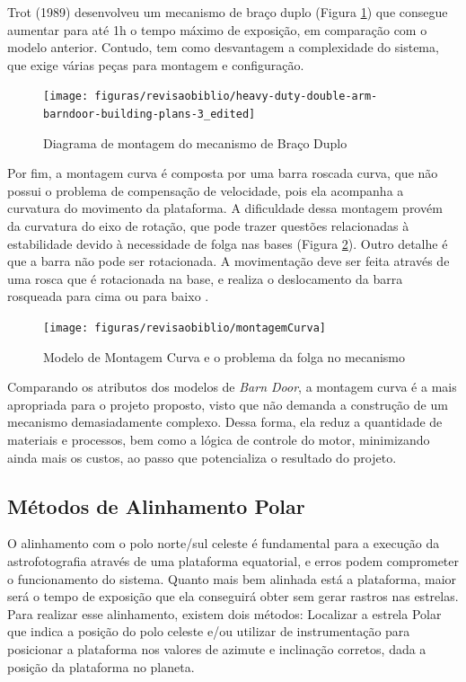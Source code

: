 Trot (1989) desenvolveu um mecanismo de braço duplo (Figura \ref{fig:doublearm}) que consegue aumentar para até 1h o tempo máximo de exposição, em comparação com o modelo anterior. Contudo, tem como desvantagem a complexidade do sistema, que exige várias peças para montagem e configuração.

\begin{figure}[!htb]
	\centering
	\caption{Diagrama de montagem do mecanismo de Braço Duplo}
	\texttt{[image: figuras/revisaobiblio/heavy-duty-double-arm-barndoor-building-plans-3\_edited]}
	\label{fig:doublearm}
\end{figure}

Por fim, a montagem curva é composta por uma barra roscada curva, que não possui o problema de compensação de velocidade, pois ela acompanha a curvatura do movimento da plataforma. A dificuldade dessa montagem provém da curvatura do eixo de rotação, que pode trazer questões relacionadas à estabilidade devido à necessidade de folga nas bases (Figura \ref{fig:montagemCurva}). Outro detalhe é que a barra não pode ser rotacionada. A movimentação deve ser feita através de uma rosca que é rotacionada na base, e realiza o deslocamento da barra rosqueada para cima ou para baixo \cite{site:pentaxBarnDoor}.  

 
 \begin{figure}[!htb]
 	\centering
 	\caption[Modelo de Montagem Curva]{Modelo de Montagem Curva e o problema da folga no mecanismo}
 	\texttt{[image: figuras/revisaobiblio/montagemCurva]}
 	\label{fig:montagemCurva}
 \end{figure}

Comparando os atributos dos modelos de \textit{Barn Door}, a montagem curva é a mais apropriada para o projeto proposto, visto que não demanda a construção de um mecanismo demasiadamente complexo. Dessa forma, ela reduz a quantidade de materiais e processos, bem como a lógica de controle do motor, minimizando ainda mais os custos, ao passo que potencializa o resultado do projeto. 

\subsection{Métodos de Alinhamento Polar}
O alinhamento com o polo norte/sul celeste é fundamental para a execução da astrofotografia através de uma plataforma equatorial, e erros podem comprometer o funcionamento do sistema. Quanto mais bem alinhada está a plataforma, maior será o tempo de exposição que ela conseguirá obter sem gerar rastros nas estrelas. Para realizar esse alinhamento, existem dois métodos: Localizar a estrela Polar que indica a posição do polo celeste e/ou utilizar de instrumentação para posicionar a plataforma nos valores de azimute e inclinação corretos, dada a posição da plataforma no planeta.

